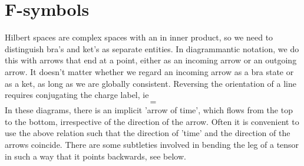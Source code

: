 \documentclass[12pt]{article}
\begin{document}
\section{F-symbols}

Hilbert spaces are complex spaces with an in inner product, so we need to distinguish
bra's and ket's as separate entities. In diagrammantic notation, we do this with
arrows that end at a point, either as an incoming arrow or an outgoing arrow.
It doesn't matter whether we regard an incoming arrow as a bra state
or as a ket, as long as we are globally consistent. Reversing the orientation of a line
requires conjugating the charge label, ie
\begin{equation}
\begin{gathered}

\end{gathered}
=
\begin{gathered}

\end{gathered}
\end{equation}
In these diagrams, there is an implicit 'arrow of time', which flows from the top to the bottom,
irrespective of the direction of the arrow. Often it is convenient to use the above relation such
that the direction of 'time' and the direction of the arrows coincide. There are some subtleties
involved in bending the leg of a tensor in such a way that it points backwards, see below.
\end{document}
